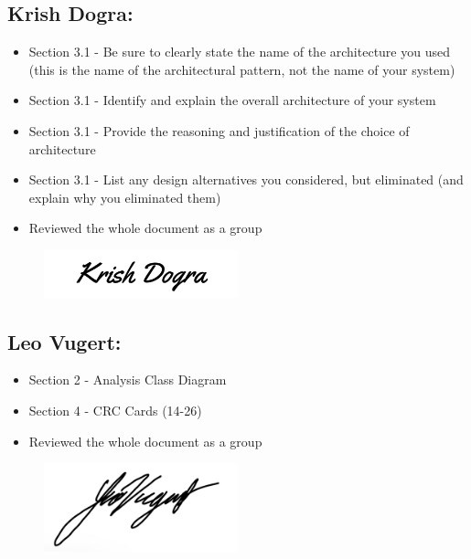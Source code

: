 \documentclass[]{article}
\begin{document}
\subsection*{Krish Dogra:}
\begin{itemize}
	\item Section 3.1 - Be sure to clearly state the name of the architecture you used (this is the name of the architectural
	      pattern, not the name of your system)
	\item Section 3.1 - Identify and explain the overall architecture of your system
	\item Section 3.1 - Provide the reasoning and justification of the choice of architecture
	\item Section 3.1 - List any design alternatives you considered, but eliminated (and explain why you eliminated them)
	\item Reviewed the whole document as a group
\end{itemize}
\begin{figure}[h]
	\centering
	\includegraphics[width=0.5\textwidth]{KrishSignature.jpg}
	\label{fig:signature}
\end{figure}


\subsection*{Leo Vugert:}
\begin{itemize}
	\item Section 2 - Analysis Class Diagram
	\item Section 4 - CRC Cards (14-26)
	\item Reviewed the whole document as a group
\end{itemize}
\begin{figure}[h]
	\centering
	\includegraphics[width=0.5\textwidth]{LeoSignature.jpg}
	\label{fig:signature}
\end{figure}

\end{document}
